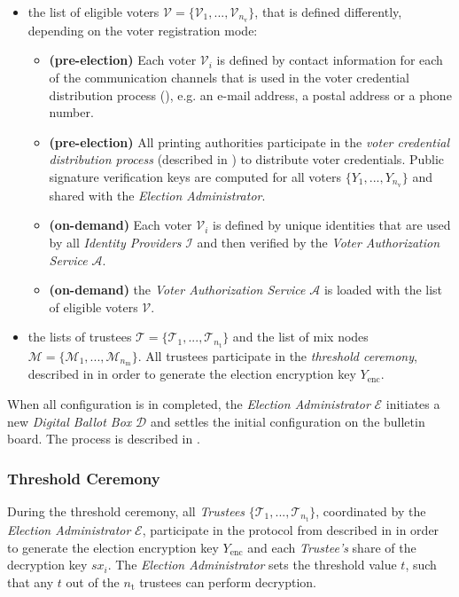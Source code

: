 \begin{itemize}
    \item the list of eligible voters \( \boldsymbol{\mathcal{V}} = \{\mathcal{V}_1, ..., \mathcal{V}_{n_\mathrm{v}}\} \), that is defined differently, depending on the voter registration mode:
    \begin{itemize}
        \item \textbf{(pre-election)} Each voter $\mathcal{V}_i$ is defined by contact information for each of the communication channels that is used in the voter credential distribution process (), e.g. an e-mail address, a postal address or a phone number.
        \item \textbf{(pre-election)} All printing authorities participate in the \textit{voter credential distribution process} (described in ) to distribute voter credentials. Public signature verification keys are computed for all voters $\{Y_1, ..., Y_{n_\mathrm{v}}\}$ and shared with the \textit{Election Administrator}.
        \item \textbf{(on-demand)} Each voter $\mathcal{V}_i$ is defined by unique identities that are used by all \textit{Identity Providers} $\boldsymbol{\mathcal{I}}$ and then verified by the \textit{Voter Authorization Service} $\mathcal{A}$.
        \item \textbf{(on-demand)} the \textit{Voter Authorization Service} $\mathcal{A}$ is loaded with the list of eligible voters $\boldsymbol{\mathcal{V}}$.
    \end{itemize}
    \item the lists of trustees \( \boldsymbol{\mathcal{T}} = \{\mathcal{T}_1, ..., \mathcal{T}_{n_\mathrm{t}}\} \) and the list of mix nodes \( \boldsymbol{\mathcal{M}} = \{\mathcal{M}_1, ..., \mathcal{M}_{n_\mathrm{m}}\} \). All trustees participate in the \textit{threshold ceremony}, described in  in order to generate the election encryption key $Y_\mathrm{enc}$.
\end{itemize}

When all configuration is in completed, the \textit{Election Administrator} $\mathcal{E}$ initiates a new \textit{Digital Ballot Box} $\mathcal{D}$ and settles the initial configuration on the bulletin board. The process is described in . 


\subsubsection{Threshold Ceremony} \label{sec: threshold ceremony}
During the threshold ceremony, all \textit{Trustees} $\{\mathcal{T}_1, ..., \mathcal{T}_{n_\mathrm{t}}\}$, coordinated by the \textit{Election Administrator} $\mathcal{E}$, participate in the protocol from  described in  in order to generate the election encryption key $Y_\mathrm{enc}$ and each \textit{Trustee's} share of the decryption key $sx_i$. The \textit{Election Administrator} sets the threshold value $t$, such that any $t$ out of the $n_\mathrm{t}$ trustees can perform decryption.

